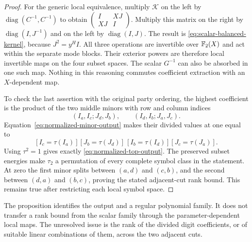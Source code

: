 \begin{proof}
For the generic local equivalence, multiply $\mathcal K$ on the
left by $\operatorname{diag}(C^{-1},C^{-1})$ to obtain
$\left(\begin{smallmatrix}I&XJ\\XJ&I\end{smallmatrix}\right)$.
Multiply this matrix on the right by
$\operatorname{diag}(I,J^{-1})$ and on the left by
$\operatorname{diag}(I,J)$. The result is
\eqref{eq:scalar-balanced-kernel}, because $J^2=y^H I$.
All three operations are invertible over $\mathbb F_2(X)$ and act
within the separate mode blocks. Their exterior powers are
therefore local invertible maps on the four subset spaces.
The scalar $G^{-1}$ can also be absorbed in one such map.
Nothing in this reasoning commutes coefficient extraction
with an $X$-dependent map.

To check the last assertion with the original party ordering,
the highest coefficient is the product of the two middle minors
with row and column indices
\[
 (I_a,I_c;J_d,J_b),\qquad (I_d,I_b;J_a,J_c).
\]
Equation~\eqref{eq:normalized-minor-output} makes their divided
values at one equal to
\[
 [I_c=\tau(I_a)][J_b=\tau(J_d)]\,
 [I_b=\tau(I_d)][J_c=\tau(J_a)].
\]
Using $\tau^2=1$ gives exactly
\eqref{eq:normalized-top-output}. The preserved subset energies
make $\tau_2$ a permutation of every complete symbol class in
the statement. At zero the first minor splits between $(a,d)$
and $(c,b)$, and the second between $(d,a)$ and $(b,c)$, proving
the stated adjacent-cut rank bound. This remains true after
restricting each local symbol space.
\end{proof}

The proposition identifies the output and a regular polynomial
family. It does not transfer a rank bound from the scalar family
through the parameter-dependent local maps. The unresolved issue
is the rank of the divided digit coefficients, or of suitable
linear combinations of them, across the two adjacent cuts.
